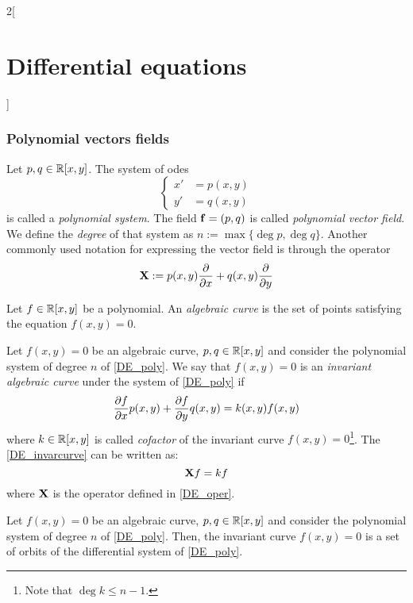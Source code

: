 \documentclass[../../../main_math.tex]{subfiles}
\begin{document}
\begin{multicols}{2}[\section{Differential equations}]
  \subsubsection{Polynomial vectors fields}
  \begin{definition}
    Let $p,q\in\mathbb{R}[x,y]$. The system of odes
    \begin{equation}\label{DE_poly}
      \left\{
      \begin{aligned}
        x' & =p(x,y) \\
        y' & =q(x,y)
      \end{aligned}
      \right.
    \end{equation}
    is called a \emph{polynomial system}. The field $\boldsymbol{\mathrm{f}}=(p,q)$ is called \emph{polynomial vector field}. We define the \emph{degree} of that system as $n:=\max\{\deg p,\deg q\}$. Another commonly used notation for expressing the vector field is through the operator
    \begin{equation}\label{DE_oper}
      \boldsymbol{\mathrm{X}}:=p(x,y)\pdv{}{x}+q(x,y)\pdv{}{y}
    \end{equation}
  \end{definition}
  \begin{definition}
    Let $f\in\mathbb{R}[x,y]$ be a polynomial. An \emph{algebraic curve} is the set of points satisfying the equation $f(x,y)=0$.
  \end{definition}
  \begin{definition}
    Let $f(x,y)=0$ be an algebraic curve, $p,q\in\mathbb{R}[x,y]$ and consider the polynomial system of degree $n$ of \cref{DE_poly}. We say that $f(x,y)=0$ is an \emph{invariant algebraic curve} under the system of \cref{DE_poly} if
    \begin{equation}\label{DE_invarcurve}
      \pdv{f}{x}(x,y)p(x,y)+\pdv{f}{y}q(x,y)=k(x,y)f(x,y)
    \end{equation}
    where $k\in\mathbb{R}[x,y]$ is called \emph{cofactor} of the invariant curve $f(x,y)=0$\footnote{Note that $\deg k\leq n-1$.}. The \cref{DE_invarcurve} can be written as: $$\boldsymbol{\mathrm{X}}f=kf$$
    where $\boldsymbol{\mathrm{X}}$ is the operator defined in \cref{DE_oper}.
  \end{definition}
  \begin{proposition}
    Let $f(x,y)=0$ be an algebraic curve, $p,q\in\mathbb{R}[x,y]$ and consider the polynomial system of degree $n$ of \cref{DE_poly}. Then, the invariant curve $f(x,y)=0$ is a set of orbits of the differential system of \cref{DE_poly}.
  \end{proposition}

\end{multicols}
\end{document}

